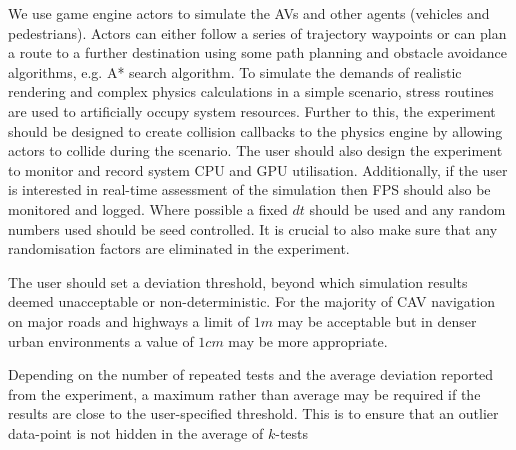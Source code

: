 We use game engine actors to simulate the AVs and other agents (vehicles and pedestrians). Actors can either follow a series of trajectory waypoints or can plan a route to a further destination using some path planning and obstacle avoidance algorithms, e.g. A* search algorithm. 
% 
To simulate the demands of realistic rendering and complex physics calculations in a simple scenario, stress routines are used to artificially occupy system resources. 
Further to this, the experiment should be designed to create collision callbacks to the physics engine by allowing actors to collide during the scenario. 
%
The user should also design the experiment to monitor and record system CPU and GPU utilisation. Additionally, if the user is interested in real-time assessment of the simulation then FPS should also be monitored and logged.
%
Where possible a fixed $dt$ should be used and any random numbers used should be seed controlled.
It is crucial to also make sure that any randomisation factors are eliminated in the experiment.

The user should set a deviation threshold, beyond which simulation results deemed unacceptable or non-deterministic. For the majority of CAV navigation on major roads and highways a limit of $1m$ may be acceptable but in denser urban environments a value of $1cm$ may be more appropriate. 

Depending on the number of repeated tests and the average deviation reported from the experiment, a maximum rather than average may be required if the results are close to the user-specified threshold. This is to ensure that an outlier data-point is not hidden in the average of $k$-tests


